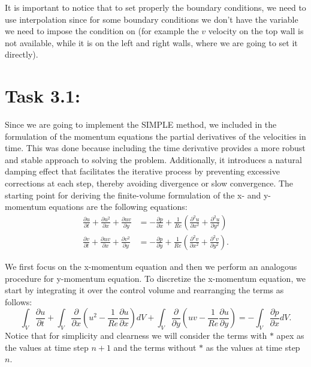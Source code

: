 \documentclass{article}
\begin{document}
It is important to notice that to set properly the boundary conditions, we need to use interpolation since for some boundary conditions we don't have the variable we need to impose the condition on (for example the $v$ velocity on the top wall is not available, while it is on the left and right walls, where we are going to set it directly).


\section*{\Large Task 3.1:}

Since we are going to implement the SIMPLE method, we included in the formulation of the momentum equations the partial derivatives of the velocities in time. This was done because including the time derivative provides a more robust and stable approach to solving the problem. Additionally, it introduces a natural damping effect that facilitates the iterative process by preventing excessive corrections at each step, thereby avoiding divergence or slow convergence.
The starting point for deriving the finite-volume formulation of the x- and y-momentum equations are the following equations:
\begin{align}
  \frac{\partial u}{\partial t} + \frac{\partial u^2}{\partial x} + \frac{\partial uv}{\partial y} &= -\frac{\partial p}{\partial x} + \frac{1}{Re} \left( \frac{\partial^2 u}{\partial x^2} + \frac{\partial^2 u}{\partial y^2} \right) \\
  \frac{\partial v}{\partial t} + \frac{\partial uv}{\partial x} + \frac{\partial v^2}{\partial y} &= -\frac{\partial p}{\partial y} + \frac{1}{Re} \left( \frac{\partial^2 v}{\partial x^2} + \frac{\partial^2 v}{\partial y^2} \right).
\end{align}

We first focus on the x-momentum equation and then we perform an analogous procedure for y-momentum equation.
To discretize the x-momentum equation, we start by integrating it over the control volume and rearranging the terms as follows:
\begin{equation*}
  \int_{V}\frac{\partial u}{\partial t} + \int_{V} \frac{\partial}{\partial x} (u^2 - \frac{1}{Re} \frac{\partial u}{\partial x}) dV + \int_{V} \frac{\partial}{\partial y} (uv - \frac{1}{Re} \frac{\partial u}{\partial y}) = - \int_{V} \frac{\partial p}{\partial x} dV .
\end{equation*}
Notice that for simplicity and clearness we will consider the terms with $*$ apex as the values at time step $n+1$ and the terms without $*$ as the values at time step $n$.
\end{document}
